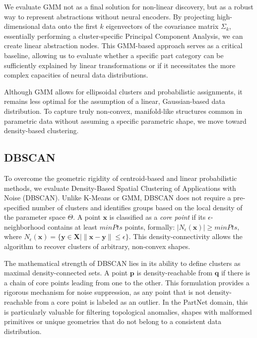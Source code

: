 \documentclass{thesis}
\begin{document}
We evaluate GMM not as a final solution for non-linear discovery, but as a robust way to represent abstractions without neural encoders. By projecting high-dimensional data onto the first $k$ eigenvectors of the covariance matrix $\Sigma_k$, essentially performing a cluster-specific Principal Component Analysis, we can create linear abstraction nodes. This GMM-based approach serves as a critical baseline, allowing us to evaluate whether a specific part category can be sufficiently explained by linear transformations or if it necessitates the more complex capacities of neural data distributions.

Although GMM allows for ellipsoidal clusters and probabilistic assignments, it remains less optimal for the assumption of a linear, Gaussian-based data distribution. To capture truly non-convex, manifold-like structures common in parametric data without assuming a specific parametric shape, we move toward density-based clustering.

\subsection{DBSCAN}

To overcome the geometric rigidity of centroid-based and linear probabilistic methods, we evaluate Density-Based Spatial Clustering of Applications with Noise (DBSCAN). Unlike K-Means or GMM, DBSCAN does not require a pre-specified number of clusters and identifies groups based on the local density of the parameter space $\Theta$. A point $\mathbf{x}$ is classified as a \textit{core point} if its $\epsilon$-neighborhood contains at least $minPts$ points, formally: $|N_\epsilon(\mathbf{x})| \geq minPts$, where $N_\epsilon(\mathbf{x}) = \{ \mathbf{y} \in \mathbf{X} \mid \|\mathbf{x} - \mathbf{y}\| \leq \epsilon \}$. This density-connectivity allows the algorithm to recover clusters of arbitrary, non-convex shapes.

The mathematical strength of DBSCAN lies in its ability to define clusters as maximal density-connected sets. A point $\mathbf{p}$ is density-reachable from $\mathbf{q}$ if there is a chain of core points leading from one to the other. This formulation provides a rigorous mechanism for noise suppression, as any point that is not density-reachable from a core point is labeled as an outlier. In the PartNet domain, this is particularly valuable for filtering topological anomalies, shapes with malformed primitives or unique geometries that do not belong to a consistent data distribution.
\end{document}
